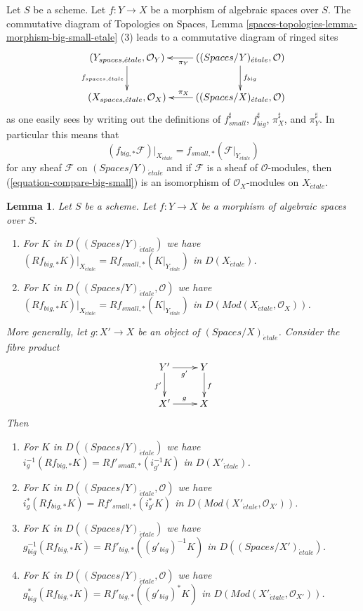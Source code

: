 \documentclass{stacks-project}
\theoremstyle{plain}
\newtheorem{lemma}[subsection]{Lemma}
\theoremstyle{definition}
\theoremstyle{remark}
\numberwithin{equation}{subsection}
\def\etale{{\acute{e}tale}}
\begin{document}
\noindent
Let $S$ be a scheme.
Let $f : Y \to X$ be a morphism of algebraic spaces over $S$.
The commutative diagram of
Topologies on Spaces, Lemma
\ref{spaces-topologies-lemma-morphism-big-small-etale} (3)
leads to a commutative diagram of ringed sites
$$
\xymatrix{
(Y_{spaces, \etale}, \mathcal{O}_Y) \ar[d]_{f_{spaces, \etale}} &
((\textit{Spaces}/Y)_\etale, \mathcal{O}) \ar[d]^{f_{big}} \ar[l]^{\pi_Y} \\
(X_{spaces, \etale}, \mathcal{O}_X) &
((\textit{Spaces}/X)_\etale, \mathcal{O}) \ar[l]_{\pi_X}
}
$$
as one easily sees by writing out the definitions of
$f_{small}^\sharp$, $f_{big}^\sharp$, $\pi_X^\sharp$, and $\pi_Y^\sharp$.
In particular this means that
\begin{equation}
\label{equation-compare-big-small}
(f_{big, *}\mathcal{F})|_{X_\etale} =
f_{small, *}(\mathcal{F}|_{Y_\etale})
\end{equation}
for any sheaf $\mathcal{F}$ on $(\textit{Spaces}/Y)_\etale$ and if
$\mathcal{F}$ is a sheaf of $\mathcal{O}$-modules, then
(\ref{equation-compare-big-small})
is an isomorphism of $\mathcal{O}_X$-modules on $X_\etale$.

\begin{lemma}
\label{lemma-compare-higher-direct-image}
Let $S$ be a scheme.
Let $f : Y \to X$ be a morphism of algebraic spaces over $S$.
\begin{enumerate}
\item For $K$ in $D((\textit{Spaces}/Y)_\etale)$ we have
$
(Rf_{big, *}K)|_{X_\etale} = Rf_{small, *}(K|_{Y_\etale})
$
in $D(X_\etale)$.
\item For $K$ in $D((\textit{Spaces}/Y)_\etale, \mathcal{O})$ we have
$
(Rf_{big, *}K)|_{X_\etale} = Rf_{small, *}(K|_{Y_\etale})
$
in $D(\textit{Mod}(X_\etale, \mathcal{O}_X))$.
\end{enumerate}
More generally, let $g : X' \to X$ be an object of
$(\textit{Spaces}/X)_\etale$. Consider the fibre product
$$
\xymatrix{
Y' \ar[r]_{g'} \ar[d]_{f'} & Y \ar[d]^f \\
X' \ar[r]^g & X
}
$$
Then
\begin{enumerate}
\item[(3)] For $K$ in $D((\textit{Spaces}/Y)_\etale)$ we have
$i_g^{-1}(Rf_{big, *}K) = Rf'_{small, *}(i_{g'}^{-1}K)$
in $D(X'_\etale)$.
\item[(4)] For $K$ in $D((\textit{Spaces}/Y)_\etale, \mathcal{O})$ we have
$i_g^*(Rf_{big, *}K) = Rf'_{small, *}(i_{g'}^*K)$
in $D(\textit{Mod}(X'_\etale, \mathcal{O}_{X'}))$.
\item[(5)] For $K$ in $D((\textit{Spaces}/Y)_\etale)$ we have
$g_{big}^{-1}(Rf_{big, *}K) = Rf'_{big, *}((g'_{big})^{-1}K)$
in $D((\textit{Spaces}/X')_\etale)$.
\item[(6)] For $K$ in $D((\textit{Spaces}/Y)_\etale, \mathcal{O})$ we have
$g_{big}^*(Rf_{big, *}K) = Rf'_{big, *}((g'_{big})^*K)$
in $D(\textit{Mod}(X'_\etale, \mathcal{O}_{X'}))$.
\end{enumerate}
\end{lemma}
\end{document}
